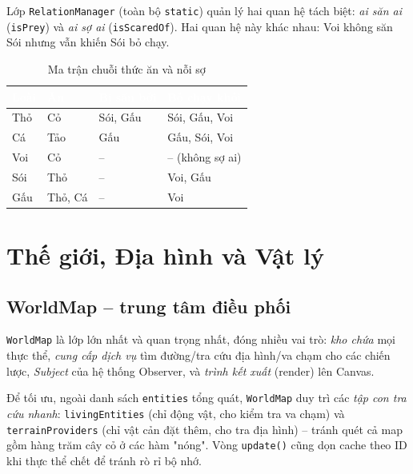 \documentclass[12pt,a4paper]{report}
\newcommand{\code}[1]{\texttt{\small #1}}
\begin{document}
Lớp \code{RelationManager} (toàn bộ \code{static}) quản lý hai quan hệ tách biệt: \textit{ai săn ai} (\code{isPrey}) và \textit{ai sợ ai} (\code{isScaredOf}). Hai quan hệ này khác nhau: Voi không săn Sói nhưng vẫn khiến Sói bỏ chạy.

\begin{table}[H]
\centering
\caption{Ma trận chuỗi thức ăn và nỗi sợ}
\begin{tabular}{L{2.3cm} L{2.8cm} L{2.8cm} L{3.5cm}}
\toprule
{}
\textcolor{white}{\textbf{Loài}} &
\textcolor{white}{\textbf{Ăn}} &
\textcolor{white}{\textbf{Bị săn bởi}} &
\textcolor{white}{\textbf{Bỏ chạy khỏi}} \\
\midrule
Thỏ & Cỏ & Sói, Gấu & Sói, Gấu, Voi \\
 Cá & Tảo & Gấu & Gấu, Sói, Voi \\
Voi & Cỏ & -- & -- (không sợ ai) \\
 Sói & Thỏ & -- & Voi, Gấu \\
Gấu & Thỏ, Cá & -- & Voi \\
\bottomrule
\end{tabular}
\end{table}

\chapter{Thế giới, Địa hình và Vật lý}

\section{WorldMap -- trung tâm điều phối}

\code{WorldMap} là lớp lớn nhất và quan trọng nhất, đóng nhiều vai trò: \textit{kho chứa} mọi thực thể, \textit{cung cấp dịch vụ} tìm đường/tra cứu địa hình/va chạm cho các chiến lược, \textit{Subject} của hệ thống Observer, và \textit{trình kết xuất} (render) lên Canvas.

Để tối ưu, ngoài danh sách \code{entities} tổng quát, \code{WorldMap} duy trì các \textit{tập con tra cứu nhanh}: \code{livingEntities} (chỉ động vật, cho kiểm tra va chạm) và \code{terrainProviders} (chỉ vật cản đặt thêm, cho tra địa hình) -- tránh quét cả map gồm hàng trăm cây cỏ ở các hàm "nóng". Vòng \code{update()} cũng dọn cache theo ID khi thực thể chết để tránh rò rỉ bộ nhớ.
\end{document}
